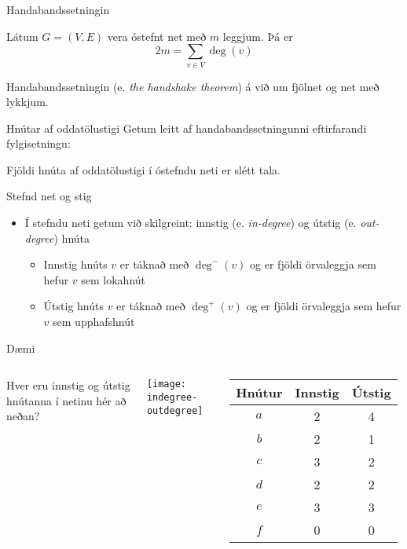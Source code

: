 \documentclass[handout]{beamer}
\begin{document}
\begin{frame}{Handabandssetningin}
\begin{tcolorbox}[title=Handabandssetningin]
Látum $G = (V, E)$ vera óstefnt net með $m$ leggjum. Þá er
\[
 2m = \sum_{v \in V} \deg(v)
\]
\end{tcolorbox}
Handabandssetningin (e. \emph{the handshake theorem}) á við um fjölnet og net með lykkjum.
\end{frame}

\begin{frame}{Hnútar af oddatölustigi}
    Getum leitt af handabandssetningunni eftirfarandi fylgisetningu:
    \begin{tcolorbox}
    Fjöldi hnúta af oddatölustigi í óstefndu neti er slétt tala.
    \end{tcolorbox}
\end{frame}
    
\begin{frame}{Stefnd net og stig}
    \begin{itemize}
        \item Í stefndu neti getum við skilgreint: innstig (e. \emph{in-degree}) og útstig (e. \emph{out-degree}) hnúta
        \begin{itemize}
            \item Innstig hnúts $v$ er táknað með $\deg^-(v)$ og er fjöldi örvaleggja sem hefur $v$ sem lokahnút
            \item Útstig hnúts $v$ er táknað með $\deg^+(v)$ og er fjöldi örvaleggja sem hefur $v$ sem upphafshnút
        \end{itemize}
    \end{itemize}
\end{frame}
    
\begin{frame}{Dæmi}
    \begin{columns}
    Hver eru innstig og útstig hnútanna í netinu hér að neðan?
    
    \vspace{0.5cm}
    \texttt{[image: indegree-outdegree]}
    \pause
    \begin{tabular}{ccc}
    \toprule
    Hnútur&Innstig&Útstig\\
    \midrule
    $a$&2&4\\
    $b$&2&1\\
    $c$&3&2\\
    $d$&2&2\\
    $e$&3&3\\
    $f$&0&0\\
    \bottomrule
    \end{tabular}
    \end{columns}
\end{frame}
    
\end{document}
